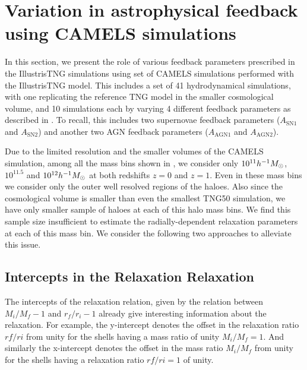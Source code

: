 \section{Variation in astrophysical feedback using CAMELS simulations}
\label{sec:res-physvar-CAMELS}
In this section, we present the role of various feedback parameters prescribed in the IllustrisTNG simulations using set of CAMELS simulations performed with the IllustrisTNG model. This includes a set of 41 hydrodynamical simulations, with one replicating the reference TNG model in the smaller cosmological volume, and 10 simulations each by varying 4 different feedback parameters as described in . To recall, this includes two supernovae feedback parameters ($A_{\mathrm{SN1}}$ and $A_{\mathrm{SN2}}$) and another two AGN feedback parameters ($A_{\mathrm{AGN1}}$ and $A_{\mathrm{AGN2}}$). 



Due to the limited resolution and the smaller volumes of the CAMELS simulation, among all the mass bins shown in , we consider only $10^{11} h^{-1}M_{\odot}$, $10^{11.5}$ and $10^{12} h^{-1}M_{\odot}$ at both redshifts $z=0$ and $z=1$. Even in these mass bins we consider only the outer well resolved regions of the haloes. Also since the cosmological volume is smaller than even the smallest TNG50 simulation, we have only smaller sample of haloes at each of this halo mass bins. We find this sample size insufficient to estimate the radially-dependent relaxation parameters at each of this mass bin. We consider the following two approaches to alleviate this issue. 

\subsection*{Intercepts in the Relaxation Relaxation}

The intercepts of the relaxation relation, given by the relation between $M_i/M_f-1$ and $r_f/r_i-1$ already give interesting information about the relaxation.
For example, the y-intercept denotes the offset in the relaxation ratio $rf/ri$ from unity for the shells having a mass ratio of unity $M_i/M_f=1$. And similarly the x-intercept denotes the offset in the mass ratio $M_i/M_f$ from unity for the shells having a relaxation ratio $rf/ri = 1$ of unity.

